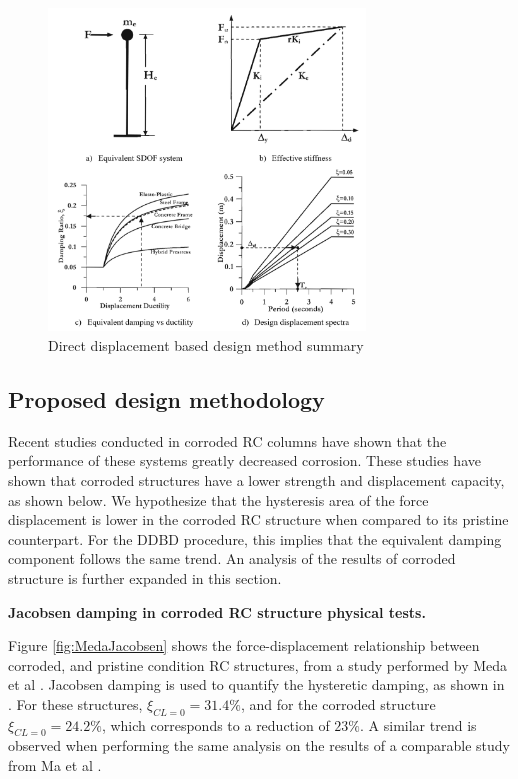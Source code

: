 \begin{figure}[htbp]
	\centering
	\includegraphics[width=0.75\textwidth]{VAC Prelim 2.0/Chapter-5/figs/DDBD.png}
	\caption{Direct displacement based design method summary \cite{Priestley2007}}
	\label{fig:DDBD_sum}
\end{figure}
\newpage

\subsection{Proposed design methodology}

Recent studies conducted in corroded RC columns have shown that the performance of these systems greatly decreased corrosion. These studies have shown that corroded structures have a lower strength and displacement capacity, as shown below. We hypothesize that the hysteresis area of the force displacement is lower in the corroded RC structure when compared to its pristine counterpart. For the DDBD procedure, this implies that the equivalent damping component follows the same trend. An analysis of the results of corroded structure is further expanded in this section. 

\textbf{Jacobsen damping in corroded RC structure physical tests.}

Figure \ref{fig:MedaJacobsen} shows the force-displacement relationship between corroded, and pristine condition RC structures, from a study performed by Meda et al  \cite{Meda2014}. Jacobsen damping is used to quantify the hysteretic damping, as shown in . For these structures, $\xi_{CL=0}=31.4\%$, and for the corroded structure $\xi_{CL=0}=24.2\%$, which corresponds to a reduction of $23\%$. A similar trend is observed when performing the same analysis on the results of a comparable  study from Ma et al \cite{Ma2012}.


